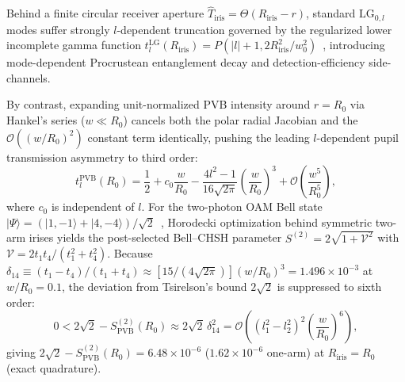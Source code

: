 \documentclass{optica-article}
\newcommand{\ket}[1]{\lvert #1 \rangle}
\newcommand{\abs}[1]{\lvert #1 \rvert}
\begin{document}
Behind a finite circular receiver aperture $\hat{T}_{\mathrm{iris}} = \Theta(R_{\mathrm{iris}} - r)$, standard $\mathrm{LG}_{0,l}$ modes suffer strongly $l$-dependent truncation governed by the regularized lower incomplete gamma function $t_l^{\mathrm{LG}}(R_{\mathrm{iris}}) = P(\abs{l}+1, 2R_{\mathrm{iris}}^2/w_0^2)$~\cite{LawEberly2004,Walborn2010}, introducing mode-dependent Procrustean entanglement decay and detection-efficiency side-channels.

By contrast, expanding unit-normalized PVB intensity around $r = R_0$ via Hankel's series ($w \ll R_0$) cancels both the polar radial Jacobian and the $\mathcal{O}((w/R_0)^2)$ constant term identically, pushing the leading $l$-dependent pupil transmission asymmetry to third order:
\begin{equation}
  t_l^{\mathrm{PVB}}(R_0) = \frac{1}{2} + c_0\frac{w}{R_0} - \frac{4l^2 - 1}{16\sqrt{2\pi}}\left(\frac{w}{R_0}\right)^3 + \mathcal{O}\!\left(\frac{w^5}{R_0^5}\right),
  \label{eq:t_pvb_asym}
\end{equation}
where $c_0$ is independent of $l$. For the two-photon OAM Bell state $\ket{\Psi} = (\ket{1,-1} + \ket{4,-4})/\sqrt{2}$~\cite{Clauser1969,Canas2021}, Horodecki optimization behind symmetric two-arm irises yields the post-selected Bell--CHSH parameter $S^{(2)} = 2\sqrt{1+\mathcal{V}^2}$ with $\mathcal{V} = 2t_1 t_4/(t_1^2 + t_4^2)$. Because $\delta_{14} \equiv (t_1 - t_4)/(t_1 + t_4) \approx [15/(4\sqrt{2\pi})](w/R_0)^3 = 1.496\times 10^{-3}$ at $w/R_0 = 0.1$, the deviation from Tsirelson's bound $2\sqrt{2}$ is suppressed to sixth order:
\begin{equation}
  0 < 2\sqrt{2} - S_{\mathrm{PVB}}^{(2)}(R_0) \approx 2\sqrt{2}\,\delta_{14}^2 = \mathcal{O}\!\left((l_1^2 - l_2^2)^2\left(\frac{w}{R_0}\right)^6\right),
  \label{eq:chsh_6th}
\end{equation}
giving $2\sqrt{2} - S_{\mathrm{PVB}}^{(2)}(R_0) = 6.48\times 10^{-6}$ ($1.62\times 10^{-6}$ one-arm) at $R_{\mathrm{iris}} = R_0$ (exact quadrature).
\end{document}
